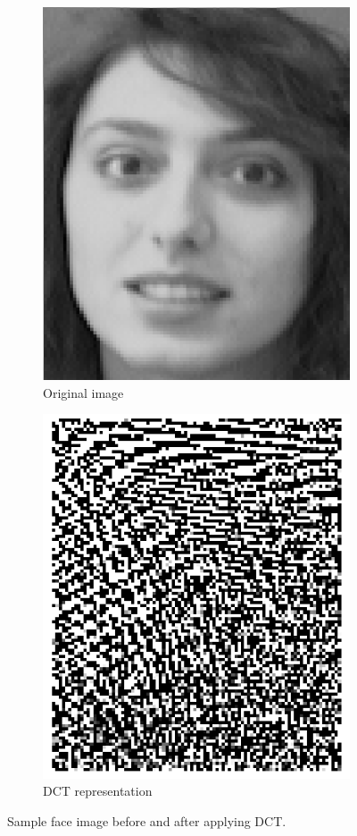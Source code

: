 \documentclass[11pt]{article}
\begin{document}
\begin{figure}[h!]
  \centering
       \begin{subfigure}[t]{0.4\textwidth}
         \centering
         \includegraphics[scale=0.4]{img/1a_orig}
         \caption{Original image}
     \end{subfigure}%
     \quad
     \begin{subfigure}[t]{0.4\textwidth}
         \centering
         \includegraphics[scale=0.4]{img/1a_dct}
         \caption{DCT representation}
     \end{subfigure}
    \caption{Sample face image before and after applying DCT.}
    \label{fig:ex1a}
\end{figure}
\end{document}
